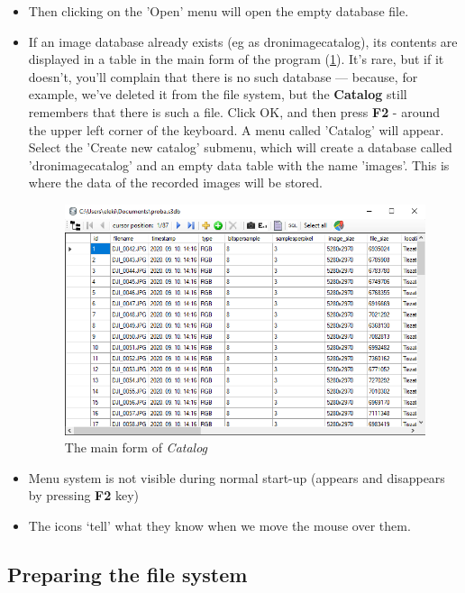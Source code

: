 \documentclass[a4paper,12pt]{article}
\begin{document}
\begin{itemize}
\item Then clicking on the 'Open' menu will open the empty database file. 

\item If an image database already exists (eg as dronimagecatalog), its contents are displayed in a table in the main form of the program (\ref{fig:catalog0}). It's rare, but if it doesn't, you'll complain that there is no such database — because, for example, we've deleted it from the file system, but the \textbf{Catalog} still remembers that there is such a file. Click OK, and then press \textbf{F2} - around the upper left corner of the keyboard. A menu called 'Catalog' will appear. Select the 'Create new catalog' submenu, which will create a database called 'dronimagecatalog' and an empty data table with the name 'images'. This is where the data of the recorded images will be stored. 

\begin{figure}
	\centering
	\includegraphics[width=13cm]{catalog0.png}
	\caption{The main form of \textit{Catalog}}
	\label{fig:catalog0}
\end{figure}

\item Menu system is not visible during normal start-up (appears and disappears by pressing \textbf{F2} key) 

\item The icons ‘tell’ what they know when we move the mouse over them. 
\end{itemize}

\subsection{Preparing the file system }
\end{document}
